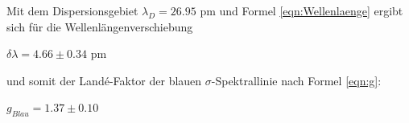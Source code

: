     \noindent
    Mit dem Dispersionsgebiet $\lambda_D = 26.95$ pm und Formel \ref{eqn:Wellenlaenge} ergibt sich für die Wellenlängenverschiebung

    \begin{center}
        $\delta \lambda = 4.66 \pm 0.34$ pm
    \end{center}

    \noindent
    und somit der Landé-Faktor der blauen $\sigma$-Spektrallinie nach Formel \ref{eqn:g}:


    \begin{center}
        $g_{Blau} = 1.37 \pm 0.10$ 
    \end{center}



